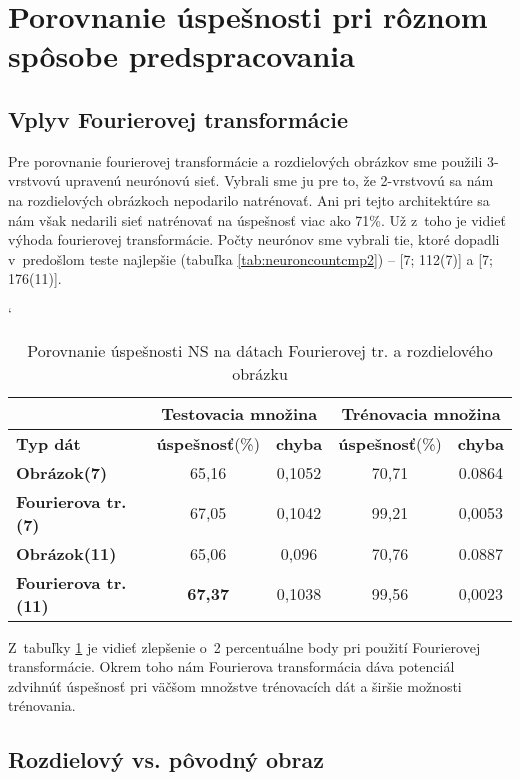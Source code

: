 \section{Porovnanie úspešnosti pri rôznom spôsobe predspracovania}

\subsection{Vplyv Fourierovej transformácie}

Pre porovnanie fourierovej transformácie a rozdielových obrázkov sme použili 3-vrstvovú upravenú neurónovú sieť. Vybrali sme ju pre to, že 2-vrstvovú sa nám na rozdielových obrázkoch nepodarilo natrénovať. Ani pri tejto architektúre sa nám však nedarili sieť natrénovať na úspešnosť viac ako 71\%. Už z~toho je vidieť výhoda fourierovej transformácie. Počty neurónov sme vybrali tie, ktoré dopadli v~predošlom teste najlepšie (tabuľka \ref{tab:neuroncountcmp2}) -- [7; 112(7)] a [7; 176(11)].

\begin{table}[htp]
\catcode` %
\centering
\begin{tabular}{|l|c|c|c|c|}
\cline{2-5}
\multicolumn{1}{l}{} & \multicolumn{2}{|c|}{\textbf{Testovacia množina}} & \multicolumn{2}{c|}{\textbf{Trénovacia množina}}\\ 
\hline
\textbf{Typ dát} & \textbf{úspešnosť}(\%) & \textbf{chyba} & \textbf{úspešnosť}(\%) & \textbf{chyba}\\ \hline
\textbf{Obrázok(7)} & 65,16 & 0,1052 & 70,71 & 0.0864 \\ \hline
\textbf{Fourierova tr.(7)} & 67,05 & 0,1042 & 99,21 & 0,0053 \\ \hline 
\textbf{Obrázok(11)} & 65,06 & 0,096 & 70,76 & 0.0887 \\ \hline
\textbf{Fourierova tr.(11)} & \textbf{67,37} & 0,1038 & 99,56 & 0,0023 \\ \hline
\end{tabular}
\caption{Porovnanie úspešnosti NS na dátach Fourierovej tr. a rozdielového obrázku}
\label{tab:neuraldataftcmp}
\end{table}

Z~tabuľky \ref{tab:neuraldataftcmp} je vidieť zlepšenie o~2 percentuálne body pri použití Fourierovej transformácie. Okrem toho nám
Fourierova transformácia dáva potenciál zdvihnúť úspešnosť pri väčšom množstve trénovacích dát a širšie možnosti trénovania. 

\subsection{Rozdielový vs. pôvodný obraz}

